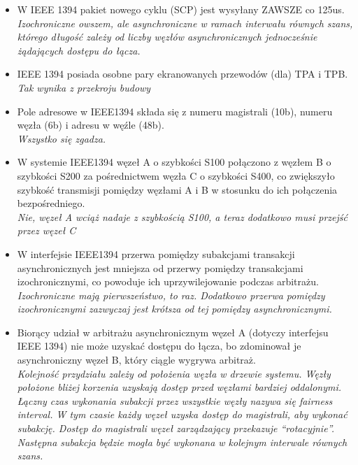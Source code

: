 \begin{itemize}
	\item \textcolor{nie}{W IEEE 1394 pakiet nowego cyklu (SCP) jest wysyłany ZAWSZE co 125us.} \\
	{\small \emph{Izochroniczne owszem, ale asynchroniczne w ramach interwału równych szans, którego długość zależy od liczby węzłów asynchronicznych jednocześnie żądających dostępu do łącza.}}
	
	\item \textcolor{tak}{IEEE 1394 posiada osobne pary ekranowanych przewodów (dla) TPA i TPB.} \\
	{\small \emph{Tak wynika z przekroju budowy}}
	
	\item \textcolor{tak}{Pole adresowe w IEEE1394 składa się z numeru magistrali (10b), numeru węzła (6b) i adresu w węźle (48b).} \\
	{\small \emph{Wszystko się zgadza.}}
	
	\item \textcolor{nie}{W systemie IEEE1394 węzeł A o szybkości S100 połączono z węzłem B o szybkości S200 za pośrednictwem węzła C o szybkości S400, co zwiększyło szybkość transmisji pomiędzy węzłami A i B w stosunku do ich połączenia bezpośredniego.} \\
	{\small \emph{Nie, węzeł A wciąż nadaje z szybkością S100, a teraz dodatkowo musi przejść przez węzeł C}}
	
	\item \textcolor{nie}{W interfejsie IEEE1394 przerwa pomiędzy subakcjami transakcji asynchronicznych jest mniejsza od przerwy pomiędzy transakcjami izochronicznymi, co powoduje ich uprzywilejowanie podczas arbitrażu.} \\
	{\small \emph{Izochroniczne mają pierwszeństwo, to raz. Dodatkowo przerwa pomiędzy izochronicznymi zazwyczaj jest krótsza od tej pomiędzy asynchronicznymi.}}
	
	\item \textcolor{nie}{Biorący udział w arbitrażu asynchronicznym węzeł A (dotyczy interfejsu IEEE 1394) nie może uzyskać dostępu do łącza, bo zdominował je asynchroniczny węzeł B, który ciągle wygrywa arbitraż.} \\
	{\small \emph{Kolejność przydziału zależy od położenia węzła w drzewie systemu. Węzły położone bliżej korzenia uzyskają dostęp przed węzłami bardziej oddalonymi. Łączny czas wykonania subakcji przez wszystkie węzły nazywa się fairness interval. W tym czasie każdy węzeł uzyska dostęp do magistrali, aby wykonać subakcję. Dostęp do magistrali węzeł zarządzający przekazuje “rotacyjnie”. Następna subakcja będzie mogła być wykonana w kolejnym interwale równych szans.}} \\
	

\end{itemize}
